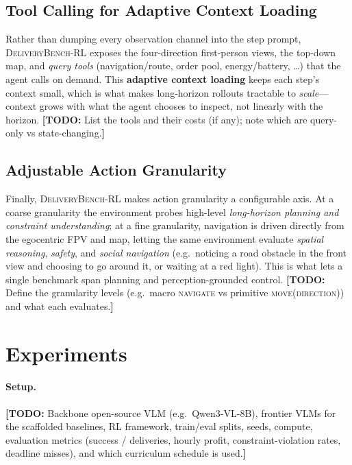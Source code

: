 \documentclass[11pt]{article}
\newcommand{\ours}{\textsc{DeliveryBench-RL}\xspace}
\newcommand{\TODO}[1]{{\color{red}\textbf{[TODO:} #1\textbf{]}}}
\begin{document}
\subsection{Tool Calling for Adaptive Context Loading}
\label{sec:env-tools}
Rather than dumping every observation channel into the step prompt, \ours
exposes the four-direction first-person views, the top-down map, and
\emph{query tools} (navigation/route, order pool, energy/battery, \dots) that
the agent calls on demand. This \textbf{adaptive context loading} keeps each
step's context small, which is what makes long-horizon rollouts tractable to
\emph{scale}---context grows with what the agent chooses to inspect, not
linearly with the horizon.
\TODO{List the tools and their costs (if any); note which are query-only vs
state-changing.}

\subsection{Adjustable Action Granularity}
\label{sec:env-granularity}
Finally, \ours makes action granularity a configurable axis. At a coarse
granularity the environment probes high-level \emph{long-horizon planning and
constraint understanding}; at a fine granularity, navigation is driven directly
from the egocentric FPV and map, letting the same environment evaluate
\emph{spatial reasoning}, \emph{safety}, and \emph{social navigation}
(e.g.\ noticing a road obstacle in the front view and choosing to go around it,
or waiting at a red light). This is what lets a single benchmark span planning
and perception-grounded control.
\TODO{Define the granularity levels (e.g.\ macro \textsc{navigate} vs primitive
\textsc{move(direction)}) and what each evaluates.}

\section{Experiments}
\label{sec:exp}

\paragraph{Setup.}
\TODO{Backbone open-source VLM (e.g.\ Qwen3-VL-8B), frontier VLMs for the
scaffolded baselines, RL framework, train/eval splits, seeds, compute,
evaluation metrics (success / deliveries, hourly profit, constraint-violation
rates, deadline misses), and which curriculum schedule is used.}
\end{document}
